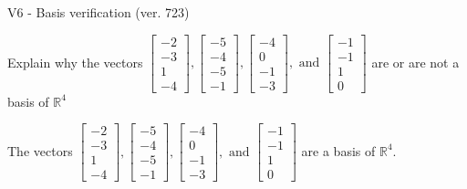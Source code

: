 \begin{exercise}
  \begin{exerciseTitle}V6 - Basis verification (ver. 723)\end{exerciseTitle}
  \begin{exerciseStatement}
    Explain why the vectors \(\left[\begin{array}{r}
-2 \\
-3 \\
1 \\
-4
\end{array}\right] , \left[\begin{array}{r}
-5 \\
-4 \\
-5 \\
-1
\end{array}\right] , \left[\begin{array}{r}
-4 \\
0 \\
-1 \\
-3
\end{array}\right] , \text{ and } \left[\begin{array}{r}
-1 \\
-1 \\
1 \\
0
\end{array}\right]\) are or are not a basis of \(\mathbb{R}^4\)	


  \end{exerciseStatement}
  \begin{exerciseAnswer}
   The vectors \(\left[\begin{array}{r}
-2 \\
-3 \\
1 \\
-4
\end{array}\right] , \left[\begin{array}{r}
-5 \\
-4 \\
-5 \\
-1
\end{array}\right] , \left[\begin{array}{r}
-4 \\
0 \\
-1 \\
-3
\end{array}\right] , \text{ and } \left[\begin{array}{r}
-1 \\
-1 \\
1 \\
0
\end{array}\right]\) 
  	 are  a basis of \(\mathbb{R}^4\).
  


  \end{exerciseAnswer}
\end{exercise}